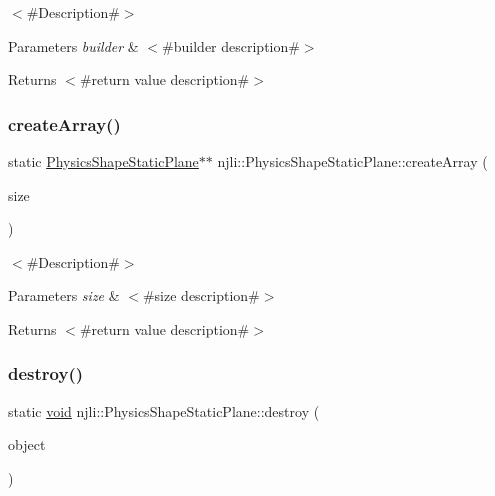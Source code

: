 $<$\#\+Description\#$>$


\begin{DoxyParams}{Parameters}
{\em builder} & $<$\#builder description\#$>$\\
\hline
\end{DoxyParams}
\begin{DoxyReturn}{Returns}
$<$\#return value description\#$>$ 
\end{DoxyReturn}
\mbox{\label{classnjli_1_1_physics_shape_static_plane_acb4c383f2673513148490879f3c44d06}} 
\subsubsection{\texorpdfstring{create\+Array()}{createArray()}}
{\footnotesize\ttfamily static \mbox{\hyperlink{classnjli_1_1_physics_shape_static_plane}{Physics\+Shape\+Static\+Plane}}$\ast$$\ast$ njli\+::\+Physics\+Shape\+Static\+Plane\+::create\+Array (\begin{DoxyParamCaption}\item[{const \mbox{\hyperlink{_util_8h_a10e94b422ef0c20dcdec20d31a1f5049}{u32}}}]{size }\end{DoxyParamCaption})\hspace{0.3cm}{\ttfamily [static]}}

$<$\#\+Description\#$>$


\begin{DoxyParams}{Parameters}
{\em size} & $<$\#size description\#$>$\\
\hline
\end{DoxyParams}
\begin{DoxyReturn}{Returns}
$<$\#return value description\#$>$ 
\end{DoxyReturn}
\mbox{\label{classnjli_1_1_physics_shape_static_plane_aea86cd8ba2fddb802e7bb812656e4874}} 
\subsubsection{\texorpdfstring{destroy()}{destroy()}}
{\footnotesize\ttfamily static \mbox{\hyperlink{_thread_8h_af1e856da2e658414cb2456cb6f7ebc66}{void}} njli\+::\+Physics\+Shape\+Static\+Plane\+::destroy (\begin{DoxyParamCaption}\item[{\mbox{\hyperlink{classnjli_1_1_physics_shape_static_plane}{Physics\+Shape\+Static\+Plane}} $\ast$}]{object }\end{DoxyParamCaption})\hspace{0.3cm}{\ttfamily [static]}}


